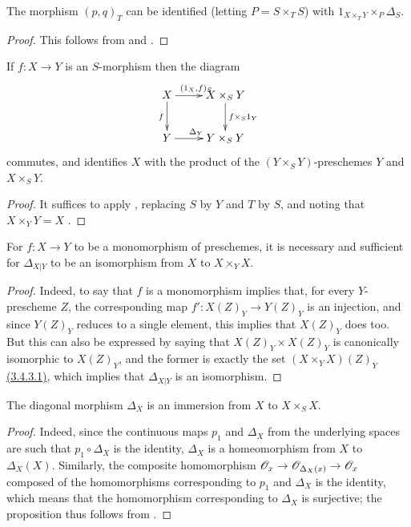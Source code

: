 \begin{cor}[5.3.6]
\label{1.5.3.6}
The morphism $(p,q)_T$ can be identified (letting $P=S\times_T S$) with $1_{X\times_T Y}\times_P\Delta_S$.
\end{cor}

\begin{proof}
\label{proof-1.5.3.6}
This follows from  and .
\end{proof}

\begin{cor}[5.3.7]
\label{1.5.3.7}
If $f:X\to Y$ is an $S$-morphism then the diagram
\[
  \xymatrix{
    X\ar[r]^{(1_X,f)_S}\ar[d]_f &
    X\times_S Y\ar[d]^{f\times_S 1_Y}\\
    Y\ar[r]^{\Delta_Y} &
    Y\times_S Y
  }
\]
commutes, and identifies $X$ with the product of the $(Y\times_S Y)$-preschemes $Y$ and $X\times_S Y$.
\end{cor}

\begin{proof}
\label{proof-1.5.3.7}
It suffices to apply , replacing $S$ by $Y$ and $T$ by $S$, and noting that $X\times_Y Y=X$ .
\end{proof}

\begin{prop}[5.3.8]
\label{1.5.3.8}
For $f:X\to Y$ to be a monomorphism of preschemes, it is necessary and sufficient for $\Delta_{X|Y}$ to be an isomorphism from $X$ to $X\times_Y X$.
\end{prop}

\begin{proof}
\label{1.5.3.8}
Indeed, to say that $f$ is a monomorphism implies that, for every $Y$-prescheme $Z$, the corresponding map $f':X(Z)_Y\to Y(Z)_Y$ is an injection, and since $Y(Z)_Y$ reduces to a single element, this implies that $X(Z)_Y$ does too.
But this can also be expressed by saying that $X(Z)_Y\times X(Z)_Y$ is canonically isomorphic to $X(Z)_Y$, and the former is exactly the set $(X\times_Y X)(Z)_Y$ \hyperref[1.3.4.3]{(3.4.3.1)}, which implies that $\Delta_{X|Y}$ is an isomorphism.
\end{proof}

\begin{prop}[5.3.9]
\label{1.5.3.9}
The diagonal morphism $\Delta_X$ is an immersion from $X$ to $X\times_S X$.
\end{prop}

\begin{proof}
\label{proof-1.5.3.9}
Indeed, since the continuous maps $p_1$ and $\Delta_X$ from the underlying spaces are such that $p_1\circ\Delta_X$ is the identity, $\Delta_X$ is a homeomorphism from $X$ to $\Delta_X(X)$.
Similarly, the composite homomorphism $\OO_x\to\OO_{\Delta_X(x)}\to\OO_x$ composed of the homomorphisms corresponding to $p_1$ and $\Delta_X$ is the identity, which means that the homomorphism corresponding to $\Delta_X$ is surjective;
the proposition thus follows from .
\end{proof}

